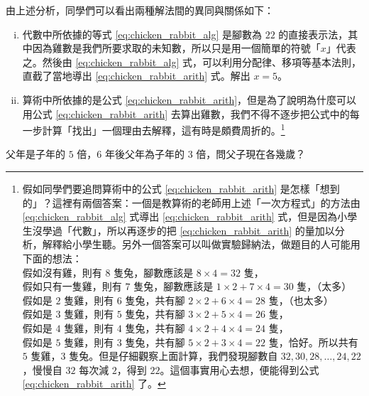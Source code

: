 由上述分析，同學們可以看出兩種解法間的異同與關係如下：
\begin{enumerate}[(i)]
  \item 代數中所依據的等式 \eqref{eq:chicken_rabbit_alg} 是腳數為 $22$ 的直接表示法，其中因為雞數是我們所要求取的未知數，所以只是用一個簡單的符號「$x$」代表之。然後由 \eqref{eq:chicken_rabbit_alg} 式，可以利用分配律、移項等基本法則，直截了當地導出 \eqref{eq:chicken_rabbit_arith} 式。解出 $x = 5$。
  \item 算術中所依據的是公式 \eqref{eq:chicken_rabbit_arith}，但是為了說明為什麼可以用公式 \eqref{eq:chicken_rabbit_arith} 去算出雞數，我們不得不逐步把公式中的每一步計算「找出」一個理由去解釋，這有時是頗費周折的。\footnote{假如同學們要追問算術中的公式 \eqref{eq:chicken_rabbit_arith} 是怎樣「想到的」？這裡有兩個答案：一個是教算術的老師用上述「一次方程式」的方法由 \eqref{eq:chicken_rabbit_alg} 式導出 \eqref{eq:chicken_rabbit_arith} 式，但是因為小學生沒學過「代數」，所以再逐步的把 \eqref{eq:chicken_rabbit_arith} 的量加以分析，解釋給小學生聽。另外一個答案可以叫做實驗歸納法，做題目的人可能用下面的想法：\\
  假如沒有雞，則有 $8$ 隻兔，腳數應該是 $8 \times 4 = 32$ 隻，\\
  假如只有一隻雞，則有 $7$ 隻兔，腳數應該是 $1 \times 2 + 7 \times 4 = 30$ 隻，（太多）\\
  假如是 $2$ 隻雞，則有 $6$ 隻兔，共有腳 $2 \times 2 + 6 \times 4 = 28$ 隻，（也太多）\\
  假如是 $3$ 隻雞，則有 $5$ 隻兔，共有腳 $3 \times 2 + 5 \times 4 = 26$ 隻，\\
  假如是 $4$ 隻雞，則有 $4$ 隻兔，共有腳 $4 \times 2 + 4 \times 4 = 24$ 隻，\\
  假如是 $5$ 隻雞，則有 $3$ 隻兔，共有腳 $5 \times 2 + 3 \times 4 = 22$ 隻，恰好。所以共有 $5$ 隻雞，$3$ 隻兔。但是仔細觀察上面計算，我們發現腳數自 $32, 30, 28, \dots, 24, 22$，慢慢自 $32$ 每次減 $2$，得到 $22$。這個事實用心去想，便能得到公式 \eqref{eq:chicken_rabbit_arith} 了。}
\end{enumerate}

\begin{example}\label{ex:4-1-2}
父年是子年的 $5$ 倍，$6$ 年後父年為子年的 $3$ 倍，問父子現在各幾歲？
\end{example}

